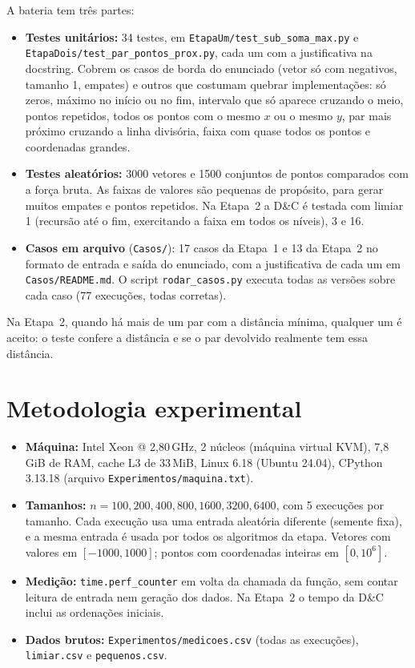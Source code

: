 \documentclass[11pt,a4paper]{article}
\begin{document}
A bateria tem três partes:
\begin{itemize}
  \item \textbf{Testes unitários:} 34 testes, em
  \nolinkurl{EtapaUm/test_sub_soma_max.py} e
  \nolinkurl{EtapaDois/test_par_pontos_prox.py}, cada um com a
  justificativa na docstring. Cobrem os casos de borda do enunciado (vetor só
  com negativos, tamanho 1, empates) e outros que costumam quebrar
  implementações: só zeros, máximo no início ou no fim, intervalo que só aparece
  cruzando o meio, pontos repetidos, todos os pontos com o mesmo $x$ ou o mesmo
  $y$, par mais próximo cruzando a linha divisória, faixa com quase todos os
  pontos e coordenadas grandes.
  \item \textbf{Testes aleatórios:} 3000 vetores e 1500 conjuntos de pontos
  comparados com a força bruta. As faixas de valores são pequenas de
  propósito, para gerar muitos empates e pontos repetidos. Na Etapa~2 a D\&C é
  testada com limiar 1 (recursão até o fim, exercitando a faixa em todos os
  níveis), 3 e 16.
  \item \textbf{Casos em arquivo} (\texttt{Casos/}): 17 casos da Etapa~1 e 13
  da Etapa~2 no formato de entrada e saída do enunciado, com a justificativa de
  cada um em \texttt{Casos/README.md}. O script \texttt{rodar\_casos.py} executa
  todas as versões sobre cada caso (77 execuções, todas corretas).
\end{itemize}
Na Etapa~2, quando há mais de um par com a distância mínima, qualquer um é
aceito: o teste confere a distância e se o par devolvido realmente tem essa
distância.

\section{Metodologia experimental}

\begin{itemize}
  \item \textbf{Máquina:} Intel Xeon @ 2{,}80\,GHz, 2 núcleos (máquina virtual
  KVM), 7{,}8\,GiB de RAM, cache L3 de 33\,MiB, Linux 6.18 (Ubuntu 24.04),
  CPython 3.13.18 (arquivo \texttt{Experimentos/maquina.txt}).
  \item \textbf{Tamanhos:} $n = 100, 200, 400, 800, 1600, 3200, 6400$, com 5
  execuções por tamanho. Cada execução usa uma entrada aleatória diferente
  (semente fixa), e a mesma entrada é usada por todos os algoritmos da etapa.
  Vetores com valores em $[-1000, 1000]$; pontos com coordenadas inteiras em
  $[0, 10^6]$.
  \item \textbf{Medição:} \texttt{time.perf\_counter} em volta da chamada da
  função, sem contar leitura de entrada nem geração dos dados. Na Etapa~2 o
  tempo da D\&C inclui as ordenações iniciais.
  \item \textbf{Dados brutos:} \texttt{Experimentos/medicoes.csv} (todas as
  execuções), \texttt{limiar.csv} e \texttt{pequenos.csv}.
\end{itemize}
\end{document}
